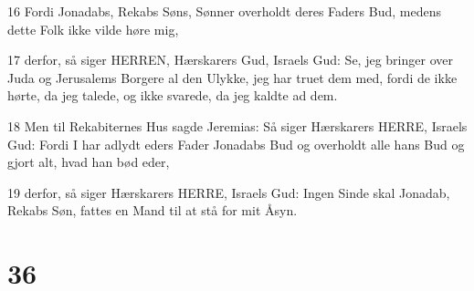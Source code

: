 \par 16 Fordi Jonadabs, Rekabs Søns, Sønner overholdt deres Faders Bud, medens dette Folk ikke vilde høre mig,
\par 17 derfor, så siger HERREN, Hærskarers Gud, Israels Gud: Se, jeg bringer over Juda og Jerusalems Borgere al den Ulykke, jeg har truet dem med, fordi de ikke hørte, da jeg talede, og ikke svarede, da jeg kaldte ad dem.
\par 18 Men til Rekabiternes Hus sagde Jeremias: Så siger Hærskarers HERRE, Israels Gud: Fordi I har adlydt eders Fader Jonadabs Bud og overholdt alle hans Bud og gjort alt, hvad han bød eder,
\par 19 derfor, så siger Hærskarers HERRE, Israels Gud: Ingen Sinde skal Jonadab, Rekabs Søn, fattes en Mand til at stå for mit Åsyn.

\chapter{36}

